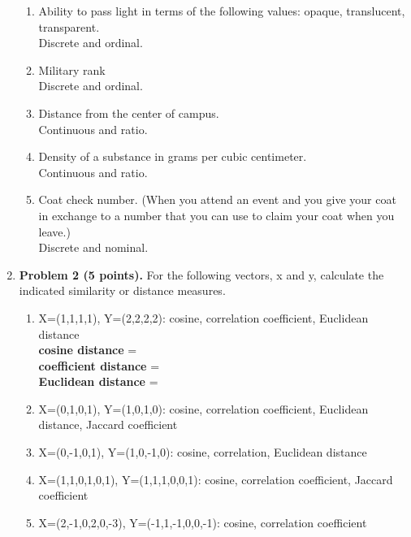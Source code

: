 \documentclass{article}%
\begin{document}
\begin{enumerate}
\begin{enumerate}
		\item Ability to pass light in terms of the following values: opaque, translucent, transparent. \\
		Discrete and ordinal.
		
		\item Military rank\\
		Discrete and ordinal.		
		
		\item Distance from the center of campus. \\
		Continuous and ratio.	
		
		\item Density of a substance in grams per cubic centimeter. \\
		Continuous and ratio.
		
		\item Coat check number. (When you attend an event and you give your coat in exchange to a number that you can use to claim your coat when you leave.) \\
		Discrete and nominal.
	\end{enumerate}
  
 \item \textbf{Problem 2 (5 points).} For the following vectors, x and y, calculate the indicated similarity or distance measures.
 \begin{enumerate}
		\item X=(1,1,1,1), Y=(2,2,2,2): cosine, correlation coefficient, Euclidean distance \\
		\textbf{cosine distance} = \\
		\textbf{coefficient distance} = \\		
		\textbf{Euclidean distance} = \\	
			
		\item X=(0,1,0,1), Y=(1,0,1,0): cosine, correlation coefficient, Euclidean distance, Jaccard coefficient \\
		
		\item X=(0,-1,0,1), Y=(1,0,-1,0): cosine, correlation, Euclidean distance \\
		
		\item X=(1,1,0,1,0,1), Y=(1,1,1,0,0,1): cosine, correlation coefficient, Jaccard coefficient \\
		
		\item X=(2,-1,0,2,0,-3), Y=(-1,1,-1,0,0,-1): cosine, correlation coefficient \\
		

\end{enumerate}
\end{enumerate}
\end{document}
